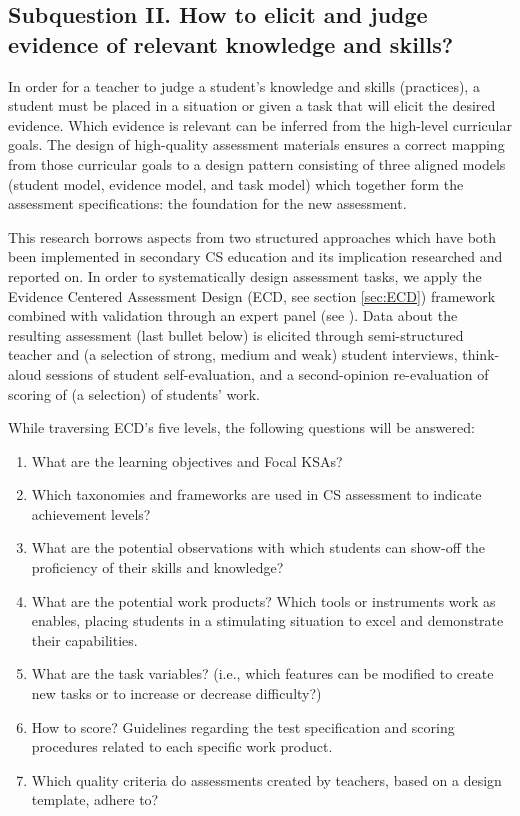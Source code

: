 \subsection{Subquestion II. How to elicit and judge evidence of relevant knowledge and skills?}%

In order for a teacher to judge a student's knowledge and skills (practices), a student must be placed in a situation or given a task that will elicit the desired evidence. Which evidence is relevant can be inferred from the high-level curricular goals. The design of high-quality assessment materials ensures a correct mapping from those curricular goals to a design pattern consisting of three aligned models (student model, evidence model, and task model) which together form the assessment specifications: the foundation for the new assessment.

This research borrows aspects from two structured approaches which have both been implemented in secondary CS education and its implication researched and reported on. In order to systematically design assessment tasks, we apply the Evidence Centered Assessment Design (ECD, see section \ref{sec:ECD}) framework combined with validation through an expert panel (see \cite{catete2017framework}). Data about the resulting assessment (last bullet below) is elicited through semi-structured teacher and (a selection of strong, medium and weak) student interviews, think-aloud sessions of student self-evaluation, and a second-opinion re-evaluation of scoring of (a selection) of students' work.

While traversing ECD's five levels, the following questions will be answered:

\begin{enumerate}
\item What are the learning objectives and Focal KSAs?
\item Which taxonomies and frameworks are used in CS assessment to indicate achievement levels?
\item What are the potential observations with which students can show-off the proficiency of their skills and knowledge?
\item What are the potential work products? Which tools or instruments work as enables, placing students in a stimulating situation to excel and demonstrate their capabilities.
\item What are the task variables? (i.e., which features can be modified to create new tasks or to increase or decrease difficulty?)
\item How to score? Guidelines regarding the test specification and scoring procedures related to each specific work product.
\item Which quality criteria do assessments created by teachers, based on a design template, adhere to?

\end{enumerate}





